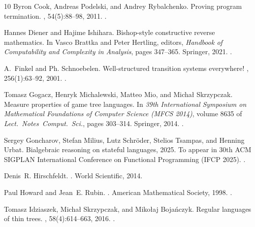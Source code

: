 \documentclass[10pt,a4paper]{article}
\theoremstyle{definition}
\theoremstyle{remark}
\numberwithin{equation}{section}
\theoremstyle{plain}
\theoremstyle{definition}
\begin{document}
\begin{thebibliography}{10}
Byron Cook, Andreas Podelski, and Andrey Rybalchenko.
\newblock Proving program termination.
, 54(5):88–98, 2011.
\newblock \href {https://doi.org/10.1145/1941487.1941509}
  {}.

Hannes Diener and Hajime Ishihara.
\newblock Bishop-style constructive reverse mathematics.
\newblock In Vasco Brattka and Peter Hertling, editors, {\em Handbook of
  Computability and Complexity in Analysis}, pages 347--365. Springer, 2021.
\newblock \href {https://doi.org/10.1007/978-3-030-59234-9_10}
  {}.

A.~Finkel and Ph. Schnoebelen.
\newblock Well-structured transition systems everywhere!
, 256(1):63--92, 2001.
\newblock \href {https://doi.org/10.1016/S0304-3975(00)00102-X}
  {}.

Tomasz Gogacz, Henryk Michalewski, Matteo Mio, and Micha{\l} Skrzypczak.
\newblock Measure properties of game tree languages.
\newblock In {\em 39th International Symposium on Mathematical Foundations of
  Computer Science (MFCS 2014)}, volume 8635 of {\em Lect.~Notes~Comput.~Sci.},
  pages 303--314. Springer, 2014.
\newblock \href {https://doi.org/10.1007/978-3-662-44522-8_26}
  {}.

Sergey Goncharov, Stefan Milius, Lutz Schröder, Stelios Tsampas, and Henning
  Urbat.
\newblock Bialgebraic reasoning on stateful languages, 2025.
\newblock To appear in 30th ACM SIGPLAN International Conference on Functional
  Programming (IFCP 2025).
\newblock \href {https://arxiv.org/abs/2503.10955} {}.

Denis~R. Hirschfeldt.
.
\newblock World Scientific, 2014.

Paul Howard and Jean~E. Rubin.
.
\newblock American Mathematical Society, 1998.
\newblock \href {https://doi.org/10.1017/S1079898600003449}
  {}.

Tomasz Idziaszek, Micha{\l} Skrzypczak, and Miko{\l}aj Boja{\'n}czyk.
\newblock Regular languages of thin trees.
, 58(4):614--663, 2016.
\newblock \href {https://doi.org/10.1007/S00224-014-9595-Z}
  {}.


\end{thebibliography}
\end{document}
